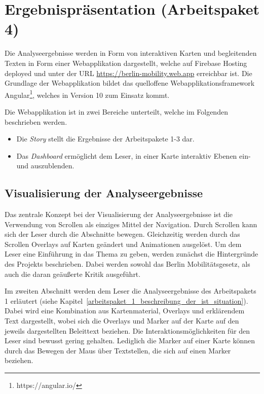 \newpage

\section{Ergebnispräsentation (Arbeitspaket 4)}
\label{ergebnispraesentation}

Die Analyseergebnisse werden in Form von interaktiven Karten und begleitenden Texten in Form einer Webapplikation dargestellt, welche auf Firebase Hosting deployed und unter der URL \url{https://berlin-mobility.web.app} erreichbar ist. Die Grundlage der Webapplikation bildet das quelloffene Webapplikationsframework Angular\footnote{https://angular.io/}, welches in Version 10 zum Einsatz kommt.


Die Webapplikation ist in zwei Bereiche unterteilt, welche im Folgenden beschrieben werden.

\begin{itemize}
    \item Die \emph{Story} stellt die Ergebnisse der Arbeitspakete 1-3 dar.
    \item Das \emph{Dashboard} ermöglicht dem Leser, in einer Karte interaktiv Ebenen ein- und auszublenden.
\end{itemize}

\subsection{Visualisierung der Analyseergebnisse}
\label{visualisierung_der_analyseergebnisse}

Das zentrale Konzept bei der Visualisierung der Analyseergebnisse ist die Verwendung von Scrollen als einziges Mittel der Navigation. Durch Scrollen kann sich der Leser durch die Abschnitte bewegen. Gleichzeitig werden durch das Scrollen Overlays auf Karten geändert und Animationen ausgelöst.  Um dem Leser eine Einführung in das Thema zu geben, werden zunächst die Hintergründe des Projekts beschrieben. Dabei werden sowohl das Berlin Mobilitätsgesetz, als auch die daran geäußerte Kritik ausgeführt.

Im zweiten Abschnitt werden dem Leser die Analyseergebnisse des Arbeitspakets 1 erläutert (siehe Kapitel~\ref{arbeitspaket_1_beschreibung_der_ist_situation}). Dabei wird eine Kombination aus Kartenmaterial, Overlays und erklärendem Text dargestellt, wobei sich die Overlays und Marker auf der Karte auf den jeweils dargestellten Beleittext beziehen. Die Interaktionsmöglichkeiten für den Leser sind bewusst gering gehalten. Lediglich die Marker auf einer Karte können durch das Bewegen der Maus über Textstellen, die sich auf einen Marker beziehen.

